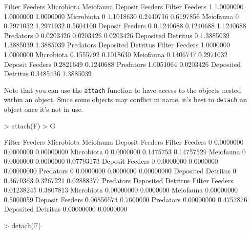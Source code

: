 \documentclass[article]{jss}
\begin{document}
\begin{Schunk}
\begin{Soutput}
                   Filter Feeders Microbiota Meiofauna Deposit Feeders
Filter Feeders                  1  1.0000000 1.0000000       1.0000000
Microbiota                      0  1.1018630 0.2440716       0.6197856
Meiofauna                       0  0.2971032 1.2971032       0.5604100
Deposit Feeders                 0  0.1240688 0.1240688       1.1240688
Predators                       0  0.0203426 0.0203426       0.0203426
Deposited Detritus              0  1.3885039 1.3885039       1.3885039
                   Predators Deposited Detritus
Filter Feeders     1.0000000          1.0000000
Microbiota         0.1555792          0.1018630
Meiofauna          0.1406747          0.2971032
Deposit Feeders    0.2821649          0.1240688
Predators          1.0051064          0.0203426
Deposited Detritus 0.3485436          1.3885039
\end{Soutput}
\end{Schunk}

Note that you can use the \texttt{attach} function to have access to the objects
nested within an object. Since some objects may conflict in name, it's
best to \texttt{detach} an object once it's not in use.

\begin{Schunk}
\begin{Sinput}
> attach(F)
> G
\end{Sinput}
\begin{Soutput}
                   Filter Feeders Microbiota Meiofauna Deposit Feeders
Filter Feeders                  0  0.0000000 0.0000000      0.00000000
Microbiota                      0  0.0000000 0.1475753      0.14757529
Meiofauna                       0  0.0000000 0.0000000      0.07793173
Deposit Feeders                 0  0.0000000 0.0000000      0.00000000
Predators                       0  0.0000000 0.0000000      0.00000000
Deposited Detritus              0  0.3670363 0.3267221      0.02888377
                    Predators Deposited Detritus
Filter Feeders     0.01238245          0.3807813
Microbiota         0.00000000          0.0000000
Meiofauna          0.00000000          0.5000059
Deposit Feeders    0.06856574          0.7600000
Predators          0.00000000          0.4757876
Deposited Detritus 0.00000000          0.0000000
\end{Soutput}
\begin{Sinput}
> detach(F)
\end{Sinput}
\end{Schunk}
\end{document}
